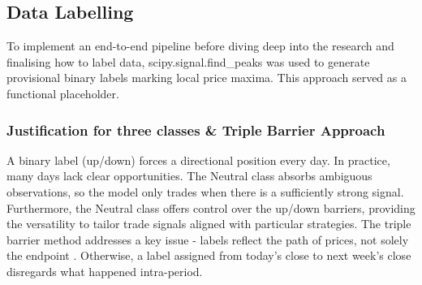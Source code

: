 \subsection{Data Labelling}
To implement an end-to-end pipeline before diving deep into the research and finalising how to label data, scipy.signal.find\_peaks \cite{Find_peaksSciPyV1170} was used to generate provisional binary labels marking local price maxima. This approach served as a functional placeholder.
\subsubsection{Justification for three classes \& Triple Barrier Approach}
A binary label (up/down) forces a directional position every day. In practice, many days lack clear opportunities. The Neutral class absorbs ambiguous observations, so the model only trades when there is a sufficiently strong signal. Furthermore, the Neutral class offers control over the up/down barriers, providing the versatility to tailor trade signals aligned with particular strategies. The triple barrier method addresses a key issue - labels reflect the path of prices, not solely the endpoint \cite{lopezdepradoAdvancesFinancialMachine2018}. Otherwise, a label assigned from today's close to next week's close disregards what happened intra-period.
